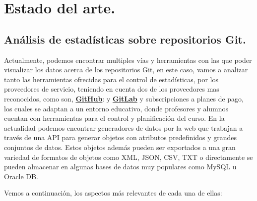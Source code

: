 \chapter{Estado del arte.\label{02estadoArte}}

\section{Análisis de estadísticas sobre repositorios Git.}

Actualmente, podemos encontrar multiples vías y herramientas con las que poder visualizar los datos acerca de los repositorios Git, en este caso, vamos a analizar tanto las herramientas ofrecidas para el control de estadísticas, por los proveedores de servicio, teniendo en cuenta dos de los proveedores mas reconocidos, como son, \textbf{\href{https://github.com/}{GitHub}}: y \textbf{\href{https://gitlab.com/}{GitLab}} y subscripciones a planes de pago, los cuales se adaptan a un entorno educativo, donde profesores y alumnos cuentan con herramientas para el control y planificación del curso.
En la actualidad podemos encontrar generadores de datos por la web que trabajan a través de una API para generar objetos con atributos predefinidos y grandes conjuntos de datos. Estos objetos además pueden ser exportados a una gran variedad de formatos de objetos como XML, JSON, CSV, TXT o directamente se pueden almacenar en algunas bases de datos muy populares como MySQL u Oracle DB.

Vemos a continuación, los aspectos más relevantes de cada una de ellas:

